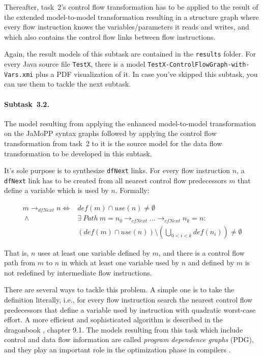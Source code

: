 \documentclass[submission,copyright,creativecommons]{eptcs}
\begin{document}
Thereafter, task~2's control flow transformation has to be applied to the
result of the extended model-to-model transformation resulting in a structure
graph where every flow instruction knows the variables/parameters it reads and
writes, and which also contains the control flow links between flow
instructions.

Again, the result models of this subtask are contained in the \verb|results|
folder.  For every Java source file \verb|TestX|, there is a model
\verb|TestX-ControlFlowGraph-with-Vars.xmi| plus a PDF visualization of it.  In
case you've skipped this subtask, you can use them to tackle the next subtask.


\paragraph{Subtask~3.2.}
\label{sec:subtask-3.2}

The model resulting from applying the enhanced model-to-model transformation on
the JaMoPP syntax graphs followed by applying the control flow transformation
from task~2 to it is the source model for the data flow transformation to be
developed in this subtask.

It's sole purpose is to synthesize \verb|dfNext| links.  For every flow
instruction $n$, a \verb|dfNext| link has to be created from all nearest
control flow predecessors $m$ that define a variable which is used by $n$.
Formally:

\begin{align*}
  m \rightarrow_{dfNext} n  \iff {} & def(m) \cap use(n) \neq \emptyset\\
  ~\land {} & \exists~Path~m = n_0 \rightarrow_{cfNext} ... \rightarrow_{cfNext} n_k = n:\\
  & \left(def(m) \cap use(n)\right) \setminus \left(\bigcup_{0 < i < k}
    def(n_i)\right) \neq \emptyset
\end{align*}

That is, $n$ uses at least one variable defined by $m$, and there is a control
flow path from $m$ to $n$ in which at least one variable used by $n$ and
defined by $m$ is not redefined by intermediate flow instructions.

There are several ways to tackle this problem.  A simple one is to take the
definition literally, i.e., for every flow instruction search the nearest
control flow predecessors that define a variable used by instruction with
quadratic worst-case effort.  A more efficient and sophisticated algorithm is
described in the dragonbook \cite{Aho:CPTT}, chapter 9.1.  The models resulting
from this task which include control and data flow information are called
\emph{program dependence graphs} (PDG), and they play an important role in the
optimization phase in compilers \cite{Ferrante:1987:PDG:24039.24041}.
\end{document}
